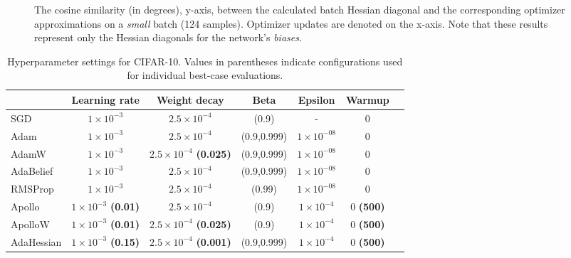\begin{figure}[h!]
    \centering
    \begin{tabular}{cc}
         \\ %
    \end{tabular}
    \caption{The cosine similarity (in degrees), y-axis, between the calculated batch Hessian diagonal and the corresponding optimizer approximations on a \emph{small} batch (124 samples).
    Optimizer updates are denoted on the x-axis.
    Note that these results represent only the Hessian diagonals for the network's \emph{biases}.}
    \label{fig:cosine-bias-big-batch}
\end{figure}

\begin{table}[h!]
    \centering
    \caption{Hyperparameter settings for CIFAR-10. Values in parentheses indicate configurations used for individual best-case evaluations. }
    \label{tab:cifar-real-comp}
    \begin{tabular}{lcccccc}  %
        \toprule
        & \textbf{Learning rate} & \textbf{Weight decay} & \textbf{Beta} & \textbf{Epsilon} & \textbf{Warmup}  \\
        \midrule
        SGD         & $1 \times 10^{-3}$ & $2.5 \times 10 ^{-4} $ & (0.9) & - & 0  \\
        Adam        & $1 \times 10^{-3}$ & $2.5 \times 10 ^{-4} $ & (0.9,0.999) & $1 \times 10^{-08}$ & 0     \\
        AdamW       & $1 \times 10^{-3}$ & $2.5 \times 10 ^{-4} $ \textbf{(0.025)} & (0.9,0.999) & $1 \times 10^{-08}$ & 0 \\
        AdaBelief   & $1 \times 10^{-3}$ & $2.5 \times 10 ^{-4} $ & (0.9,0.999) & $1 \times 10^{-08}$ & 0  \\
        RMSProp     & $1 \times 10^{-3}$ & $2.5 \times 10 ^{-4} $ & (0.99) & $1 \times 10^{-08}$ & 0 \\
        Apollo      & $1 \times 10^{-3}$ \textbf{(0.01)} & $2.5 \times 10 ^{-4}$ & (0.9) & $1 \times 10 ^{-4} $ & 0 \textbf{(500)}\\
        ApolloW     & $1 \times 10^{-3}$ \textbf{(0.01)} & $2.5 \times 10 ^{-4} $ \textbf{(0.025)} & (0.9) & $1 \times 10 ^{-4} $ & 0 \textbf{(500)}  \\
        AdaHessian  & $1 \times 10^{-3}$ \textbf{(0.15)} & $2.5 \times 10 ^{-4}$  \textbf{(0.001)} & (0.9,0.999) &$1 \times 10 ^{-4} $& 0 \textbf{(500)} \\
        \bottomrule
    \end{tabular}
\end{table}

